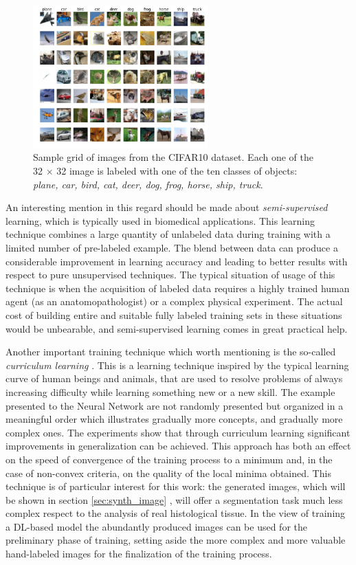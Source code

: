 \begin{figure}
    \centering
    \includegraphics[width = 0.6\textwidth]{images/cifar10}
    \caption{Sample grid of images from the CIFAR10 dataset. Each one of the 32 $\times$ 32 image is labeled with one of the ten classes of objects: \textit{plane, car, bird, cat, deer, dog, frog, horse, ship, truck}.}
    \label{fig:cf10}
\end{figure}

An interesting mention in this regard should be made about \textit{semi-supervised} learning, which is typically used in biomedical applications. This learning technique combines a large quantity of unlabeled data during training with a limited number of pre-labeled example. The blend between data can produce a considerable improvement in learning accuracy and leading to better results with respect to pure unsupervised techniques. The typical situation of usage of this technique is when the acquisition of labeled data requires a highly trained human agent (as an anatomopathologist) or a complex physical experiment. The actual cost of building entire and suitable fully labeled training sets in these situations would be unbearable, and semi-supervised learning comes in great practical help.

Another important training technique which worth mentioning is the so-called \textit{curriculum learning} \cite{10.1145/1553374.1553380}. This is a learning technique inspired by the typical learning curve of human beings and animals, that are used to resolve problems of always increasing difficulty while learning something new or a new skill. The example presented to the Neural Network are not randomly presented but organized in a meaningful order which illustrates gradually more concepts, and gradually more complex ones. The experiments show that through curriculum learning significant improvements in generalization can be achieved. This approach has both an effect on the speed of convergence of the training process to a minimum and, in the case of non-convex criteria, on the quality of the local minima obtained. This technique is of particular interest for this work: the generated images, which will be shown in section \ref{sec:synth_image} , will offer a segmentation task much less complex respect to the analysis of real histological tissue. In the view of training a DL-based model the abundantly produced images can be used for the preliminary phase of training, setting aside the more complex and more valuable hand-labeled images for the finalization of the training process.


